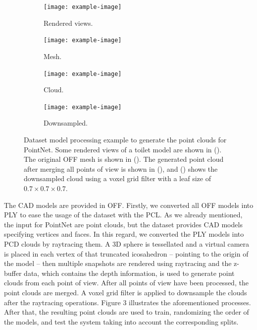 \begin{figure}[!t]
  \centering
  \begin{subfigure}{\linewidth}
    \texttt{[image: example-image]}
    \caption{Rendered views.}
    \label{fig:objrecog:dataproc:renders}
  \end{subfigure}
  \begin{subfigure}{0.32\linewidth}
    \texttt{[image: example-image]}
    \caption{Mesh.}
    \label{fig:objrecog:dataproc:mesh}
  \end{subfigure}
  \begin{subfigure}{0.32\linewidth}
    \texttt{[image: example-image]}
    \caption{Cloud.}
    \label{fig:objrecog:dataproc:cloud}
  \end{subfigure}
  \begin{subfigure}{0.32\linewidth}
    \texttt{[image: example-image]}
    \caption{Downsampled.}
    \label{fig:objrecog:dataproc:downsampled}
  \end{subfigure}
  \caption{Dataset model processing example to generate the point clouds for PointNet. Some rendered views of a toilet model are shown in (). The original \ac{OFF} mesh is shown in (). The generated point cloud after merging all points of view is shown in (), and () shows the downsampled cloud using a voxel grid filter with a leaf size of $0.7 \times 0.7 \times 0.7$.}
  \label{fig:objrecog:pointnetarch}
\end{figure}

The CAD models are provided in \ac{OFF}. Firstly, we converted all \ac{OFF} models into \ac{PLY} to ease the usage of the dataset with the \ac{PCL}. As we already mentioned, the input for PointNet are point clouds, but the dataset provides \ac{CAD} models specifying vertices and faces. In this regard, we converted the PLY models into \ac{PCD} clouds by raytracing them. A 3D sphere is tessellated and a virtual camera is placed in each vertex of that truncated icosahedron – pointing to the origin of the model – then multiple snapshots are rendered using raytracing and the z-buffer data, which contains the depth information, is used to generate point clouds from each point of view. After all points of view have been processed, the point clouds are merged. A voxel grid filter is applied to downsample the clouds after the raytracing operations. Figure 3 illustrates the aforementioned processes. After that, the resulting point clouds are used to train, randomizing the order of the models, and test the system taking into account the corresponding splits.

